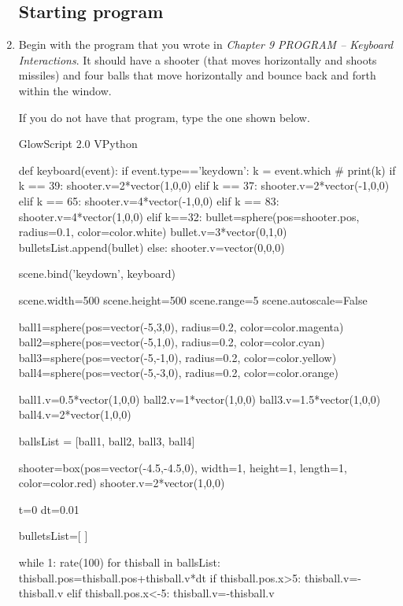 \begin{enumerate}

\subsection*{Starting program}

	\item Begin with the program that you wrote in \emph{Chapter 9 PROGRAM -- Keyboard Interactions}. It should have a shooter (that moves horizontally and shoots missiles) and four balls that move horizontally and bounce back and forth within the window.
	
	If you do not have that program, type the one shown below.
	
\begin{myvpython}
GlowScript 2.0 VPython

def keyboard(event):
    if event.type=='keydown':
        k = event.which
#        print(k)
        if k == 39:
            shooter.v=2*vector(1,0,0)
        elif k == 37:
            shooter.v=2*vector(-1,0,0)
        elif k == 65:
            shooter.v=4*vector(-1,0,0)
        elif k == 83:
            shooter.v=4*vector(1,0,0)
        elif k==32:
            bullet=sphere(pos=shooter.pos, radius=0.1, color=color.white)
            bullet.v=3*vector(0,1,0)
            bulletsList.append(bullet)
        else:
            shooter.v=vector(0,0,0)
       
scene.bind('keydown', keyboard) 

scene.width=500
scene.height=500
scene.range=5
scene.autoscale=False

ball1=sphere(pos=vector(-5,3,0), radius=0.2, color=color.magenta)
ball2=sphere(pos=vector(-5,1,0), radius=0.2, color=color.cyan)
ball3=sphere(pos=vector(-5,-1,0), radius=0.2, color=color.yellow)
ball4=sphere(pos=vector(-5,-3,0), radius=0.2, color=color.orange)

ball1.v=0.5*vector(1,0,0)
ball2.v=1*vector(1,0,0)
ball3.v=1.5*vector(1,0,0)
ball4.v=2*vector(1,0,0)

ballsList = [ball1, ball2, ball3, ball4]

shooter=box(pos=vector(-4.5,-4.5,0), width=1, height=1, length=1, color=color.red)
shooter.v=2*vector(1,0,0)

t=0
dt=0.01

bulletsList=[ ]

while 1:
    rate(100)
    for thisball in ballsList:
        thisball.pos=thisball.pos+thisball.v*dt
        if thisball.pos.x>5:
            thisball.v=-thisball.v
        elif thisball.pos.x<-5:
            thisball.v=-thisball.v


\end{myvpython}
\end{enumerate}

